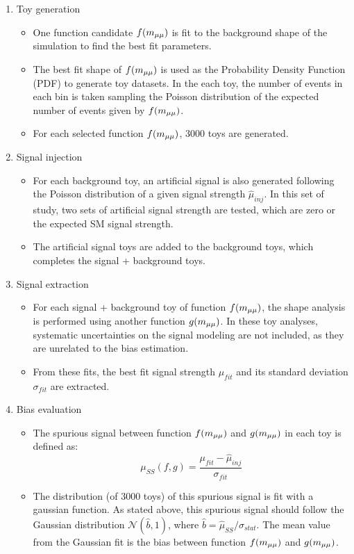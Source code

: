 \begin{enumerate}
  \item Toy generation
  \begin{itemize}
    \item One function candidate $f(m_{\mu\mu})$ is fit to the background shape of the simulation to find the best fit parameters.
    \item The best fit shape of $f(m_{\mu\mu})$ is used as the Probability Density Function (PDF) to generate toy datasets. 
          In the each toy, the number of events in each bin is taken sampling the Poisson distribution of the expected number of events given by $f(m_{\mu\mu})$. 
    \item For each selected function $f(m_{\mu\mu})$, 3000 toys are generated.      
  \end{itemize}

  \item Signal injection
  \begin{itemize}
    \item For each background toy, an artificial signal is also generated following the Poisson distribution of a given signal strength $\hat{\mu}_{inj}$. 
          In this set of study, two sets of artificial signal strength are tested, which are zero or the expected SM signal strength.
    \item The artificial signal toys are added to the background toys, which completes the signal + background toys.
  \end{itemize}
  
  \item Signal extraction
  \begin{itemize}
    \item For each signal + background toy of function $f(m_{\mu\mu})$, the shape analysis is performed using another function $g(m_{\mu\mu})$.
          In these toy analyses, systematic uncertainties on the signal modeling are not included, as they are unrelated to the bias estimation. 
    \item From these fits, the best fit signal strength $\mu_{fit}$ and its standard deviation $\sigma_{fit}$ are extracted.
  \end{itemize}

  \item Bias evaluation
  \begin{itemize}
    \item The spurious signal between function $f(m_{\mu\mu})$ and $g(m_{\mu\mu})$ in each toy is defined as: 
          \begin{equation}\label{eq:bias}
            \mu_{SS}(f, g) = \frac{\mu_{fit}-\hat{\mu}_{inj}}{\sigma_{fit}}
          \end{equation}
    \item The distribution (of 3000 toys) of this spurious signal is fit with a gaussian function. 
          As stated above, this spurious signal should follow the Gaussian distribution $\mathcal{N}(\hat{b}, 1)$,
          where $\hat{b} = \hat{\mu}_{SS} / \sigma_{stat}$.
          The mean value from the Gaussian fit is the bias between function $f(m_{\mu\mu})$ and $g(m_{\mu\mu})$.
  \end{itemize}
\end{enumerate}



